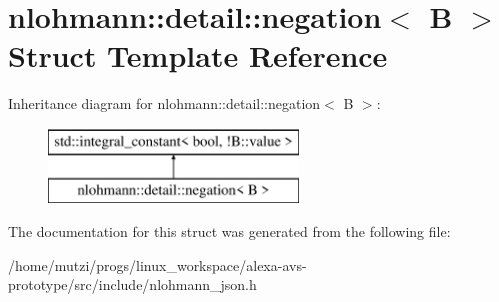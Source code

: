 \hypertarget{structnlohmann_1_1detail_1_1negation}{}\section{nlohmann\+:\+:detail\+:\+:negation$<$ B $>$ Struct Template Reference}
\label{structnlohmann_1_1detail_1_1negation}
Inheritance diagram for nlohmann\+:\+:detail\+:\+:negation$<$ B $>$\+:\begin{figure}[H]
\begin{center}
\leavevmode
\includegraphics[height=2.000000cm]{d1/d91/structnlohmann_1_1detail_1_1negation}
\end{center}
\end{figure}


The documentation for this struct was generated from the following file\+:\begin{DoxyCompactItemize}
\item 
/home/mutzi/progs/linux\+\_\+workspace/alexa-\/avs-\/prototype/src/include/nlohmann\+\_\+json.\+h\end{DoxyCompactItemize}
